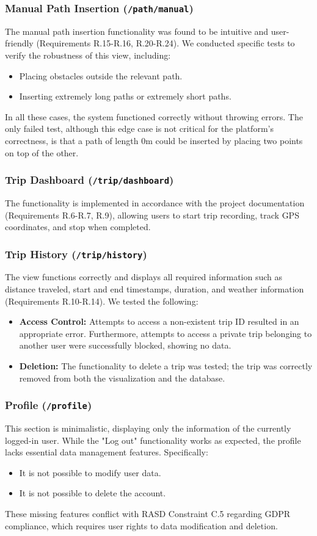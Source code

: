 \subsubsection{Manual Path Insertion (\texttt{/path/manual})}
The manual path insertion functionality was found to be intuitive and user-friendly (Requirements R.15-R.16, R.20-R.24).
We conducted specific tests to verify the robustness of this view, including:
\begin{itemize}
    \item Placing obstacles outside the relevant path.
    \item Inserting extremely long paths or extremely short paths.
\end{itemize}
In all these cases, the system functioned correctly without throwing errors.
The only failed test, although this edge case is not critical for the platform's correctness, is that a path of length 0m could be inserted by placing two points on top of the other.

\subsubsection{Trip Dashboard (\texttt{/trip/dashboard})}
The functionality is implemented in accordance with the project documentation (Requirements R.6-R.7, R.9), allowing users to start trip recording, track GPS coordinates, and stop when completed.

\subsubsection{Trip History (\texttt{/trip/history})}
The view functions correctly and displays all required information such as distance traveled, start and end timestamps, duration, and weather information (Requirements R.10-R.14).
We tested the following:
\begin{itemize}
\item \textbf{Access Control:} Attempts to access a non-existent trip ID resulted in an appropriate error. Furthermore, attempts to access a private trip belonging to another user were successfully blocked, showing no data.
\item \textbf{Deletion:} The functionality to delete a trip was tested; the trip was correctly removed from both the visualization and the database.
\end{itemize}

\subsubsection{Profile (\texttt{/profile})}
This section is minimalistic, displaying only the information of the currently logged-in user.
While the "Log out" functionality works as expected, the profile lacks essential data management features. Specifically:
\begin{itemize}
    \item It is not possible to modify user data.
    \item It is not possible to delete the account.
\end{itemize}
These missing features conflict with RASD Constraint C.5 regarding GDPR compliance, which requires user rights to data modification and deletion.